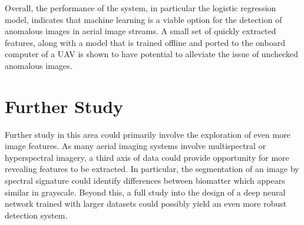 Overall, the performance of the system, in particular the logistic regression model, indicates that machine learning is a viable option for the detection of anomalous images in aerial image streams.
A small set of quickly extracted features, along with a model that is trained offline and ported to the onboard computer of a UAV is shown to have potential to alleviate the issue of unchecked anomalous images.


\section{Further Study}
Further study in this area could primarily involve the exploration of even more image features.
As many aerial imaging systems involve multispectral or hyperspectral imagery, a third axis of data could provide opportunity for more revealing features to be extracted.
In particular, the segmentation of an image by spectral signature could identify differences between biomatter which appears similar in grayscale.
Beyond this, a full study into the design of a deep neural network trained with larger datasets could possibly yield an even more robust detection system.

